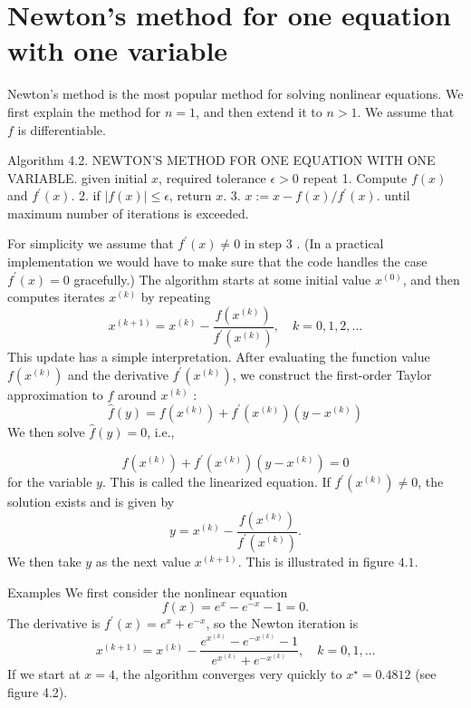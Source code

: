 \section{Newton's method for one equation with one variable}

Newton's method is the most popular method for solving nonlinear equations. We first explain the method for $ n=1 $, and then extend it to $ n>1 $. We assume that $ f $ is differentiable.

Algorithm 4.2. NEWTON'S METHOD FOR ONE EQUATION WITH ONE VARIABLE. given initial $ x $, required tolerance $ \epsilon>0 $ repeat
1. Compute $ f(x) $ and $ f^{\prime}(x) $.
2. if $ |f(x)| \leq \epsilon $, return $ x $.
3. $ x:=x-f(x) / f^{\prime}(x) $.
until maximum number of iterations is exceeded.

For simplicity we assume that $ f^{\prime}(x) \neq 0 $ in step 3 . (In a practical implementation we would have to make sure that the code handles the case $ f^{\prime}(x)=0 $ gracefully.)
The algorithm starts at some initial value $ x^{(0)} $, and then computes iterates $ x^{(k)} $ by repeating
\begin{equation}
x^{(k+1)}=x^{(k)}-\frac{f\left(x^{(k)}\right)}{f^{\prime}\left(x^{(k)}\right)}, \quad k=0,1,2, \ldots
\end{equation}
This update has a simple interpretation. After evaluating the function value $ f\left(x^{(k)}\right) $ and the derivative $ f^{\prime}\left(x^{(k)}\right) $, we construct the first-order Taylor approximation to $ f $ around $ x^{(k)} $ :
\begin{equation}
\hat{f}(y)=f\left(x^{(k)}\right)+f^{\prime}\left(x^{(k)}\right)\left(y-x^{(k)}\right)
\end{equation}
We then solve $ \hat{f}(y)=0 $, i.e.,

\begin{equation}
f\left(x^{(k)}\right)+f^{\prime}\left(x^{(k)}\right)\left(y-x^{(k)}\right)=0
\end{equation}
for the variable $ y $. This is called the linearized equation. If $ f^{\prime}\left(x^{(k)}\right) \neq 0 $, the solution exists and is given by
\begin{equation}
y=x^{(k)}-\frac{f\left(x^{(k)}\right)}{f^{\prime}\left(x^{(k)}\right)} .
\end{equation}
We then take $ y $ as the next value $ x^{(k+1)} $. This is illustrated in figure $ 4.1 $.

\begin{example}
    Examples We first consider the nonlinear equation
\begin{equation}
f(x)=e^{x}-e^{-x}-1=0 .
\end{equation}
The derivative is $ f^{\prime}(x)=e^{x}+e^{-x} $, so the Newton iteration is
\begin{equation}
x^{(k+1)}=x^{(k)}-\frac{e^{x^{(k)}}-e^{-x^{(k)}}-1}{e^{x^{(k)}}+e^{-x^{(k)}}}, \quad k=0,1, \ldots
\end{equation}
If we start at $ x=4 $, the algorithm converges very quickly to $ x^{\star}=0.4812 $ (see figure 4.2).
\end{example}

